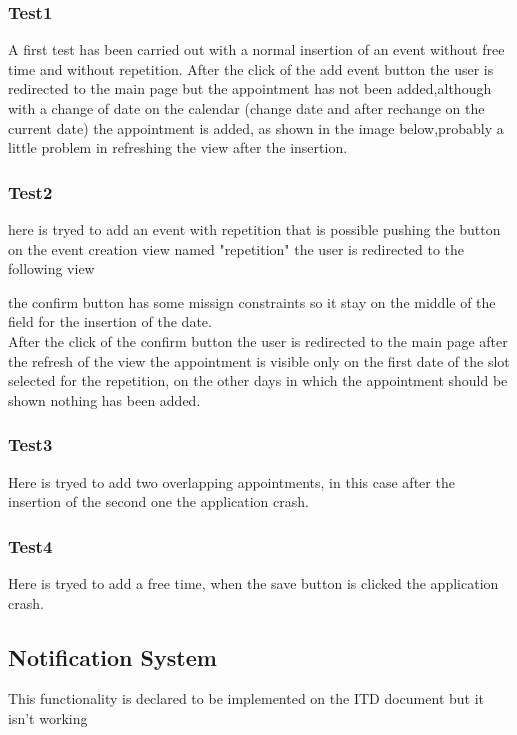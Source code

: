 \subsubsection{Test1}
A first test has been carried out with a normal insertion of an event without free time and without repetition.
After the click of the add event button the user is redirected to the main page but the appointment has not been added,although with a change of date on the calendar (change date and after rechange on the current date) the appointment is added, as shown in the image below,probably a little problem in refreshing the view after the insertion.


\subsubsection{Test2}
here is tryed to add an event with repetition that is possible pushing the button on the event creation view named "repetition" the user is redirected to the following view


the confirm button has some missign constraints so it stay on the middle of the field for the insertion of the date.\\
After the click of the confirm button the user is redirected to the main page after the refresh of the view the appointment is visible only on the first date of the slot selected for the repetition, on the other days in which the appointment should be shown nothing has been added.

\subsubsection{Test3}
Here is tryed to add two overlapping appointments, in this case after the insertion of the second one the application crash.

\subsubsection{Test4}
Here is tryed to add a free time, when the save button is clicked the application crash.

\subsection{Notification System}
This functionality is declared to be implemented on the ITD document but it isn't working

